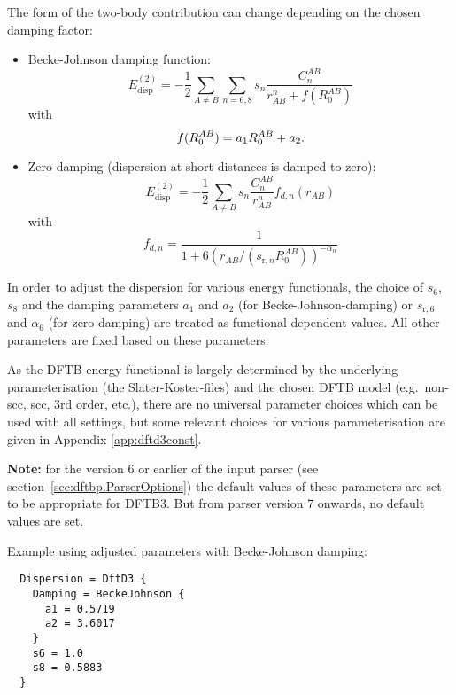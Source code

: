 The form of the two-body contribution can change depending on the chosen damping
factor:
\begin{itemize}
\item Becke-Johnson damping function:
  \begin{equation*}
    E_{\text{disp}}^{(2)} = -\frac{1}{2} \sum_{A\neq B} \sum_{n=6,8} s_n
    \frac{C_n^{AB}}{r_{AB}^n + f(R_0^{AB})}
  \end{equation*}
  with
  \begin{equation*}
    f(R_0^{AB}) = a_1 R_0^{AB} + a_2 \text.
  \end{equation*}

\item Zero-damping (dispersion at short distances is damped to zero):
  \begin{equation*}
    E_{\text{disp}}^{(2)} = -\frac{1}{2} \sum_{A \neq B} s_n
    \frac{C_n^{AB}}{r_{AB}^n} f_{d,n}(r_{AB})
  \end{equation*}
  with
  \begin{equation*}
    f_{d,n} = \frac{1}{1 + 6(r_{AB}/(s_{\text{r},n} R_0^{AB}))^{-\alpha_n}}
  \end{equation*}
\end{itemize}

In order to adjust the dispersion for various energy functionals, the choice of
$s_6$, $s_8$ and the damping parameters $a_1$ and $a_2$ (for
Becke-Johnson-damping) or $s_{\text{r},6}$ and $\alpha_6$ (for zero damping) are
treated as functional-dependent values. All other parameters are fixed based on
these parameters.

As the DFTB energy functional is largely determined by the underlying
parameterisation (the Slater-Koster-files) and the chosen DFTB model (e.g.\
non-scc, scc, 3rd order, etc.), there are no universal parameter choices which
can be used with all settings, but some relevant choices for various
parameterisation are given in Appendix \ref{app:dftd3const}.

\textbf{Note:} for the version 6 or earlier of the \dftbp{} input parser (see
section~\ref{sec:dftbp.ParserOptions}) the default values of these parameters
are set to be appropriate for DFTB3. But from parser version 7 onwards, no
default values are set.

Example using adjusted parameters with Becke-Johnson damping:
\begin{verbatim}
  Dispersion = DftD3 {
    Damping = BeckeJohnson {
      a1 = 0.5719
      a2 = 3.6017
    }
    s6 = 1.0
    s8 = 0.5883
  }
\end{verbatim}

